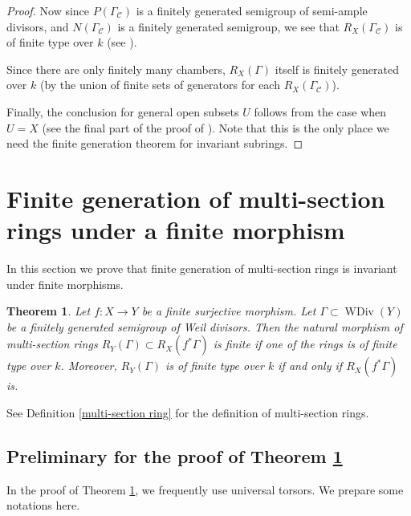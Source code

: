 \documentclass[12pt,twoside]{amsart}
\newtheorem{theo}{Theorem}[section]
\theoremstyle{definition}
\newcommand\WDivi{\mathop{\mathrm{WDiv}}\nolimits}
\begin{document}
\begin{proof}
Now since $P(\Gamma_\mathcal{C})$ is a finitely generated semigroup of semi-ample divisors, and 
$N(\Gamma_\mathcal{C})$ is a finitely generated semigroup, we see that $R_X(\Gamma_\mathcal{C})$ is
of finite type over $k$ (see \cite[Lemma 2.8]{hk}).

Since there are only finitely many chambers, $R_X(\Gamma)$ itself is finitely generated
over $k$ (by the union of finite sets of generators for each $R_X(\Gamma_\mathcal{C})$). 

Finally, the conclusion for general open subsets $U$ follows from the case when $U=X$ (see the final part
of the proof of \cite[Theorem 1.2]{b}). Note that this is the only place we need the finite generation theorem
for invariant subrings.
\end{proof}

\section{Finite generation of multi-section rings under a finite morphism}
\label{Finite generation of multi-section rings under a finite morphism}
In this section we prove that finite generation of multi-section rings is invariant
under finite morphisms.


\begin{theo}\label{finite}
Let $f:X\to Y$ be a finite surjective morphism.
Let $\Gamma\subset \WDivi{(Y)}$ be a finitely generated semigroup of Weil divisors.
Then the natural morphism of multi-section rings $R_Y(\Gamma)\subset R_X(f^{*}\Gamma)$ is finite if
one of the rings is of finite type over $k$.
Moreover, $R_Y(\Gamma)$ is of finite type over $k$ if and only if $R_X(f^{*}\Gamma)$ is.
\end{theo}

See Definition \ref{multi-section ring} for the definition of multi-section rings.


\subsection{Preliminary for the proof of Theorem \ref{finite}}
\label{Preliminary for the proof of Theorem finite}

In the proof of Theorem \ref{finite}, we frequently use universal torsors. We prepare some
notations here.
\end{document}
